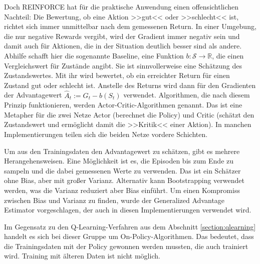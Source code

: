 Doch REINFORCE hat für die praktische Anwendung einen offensichtlichen Nachteil: Die Bewertung, ob eine Aktion >>gut<< oder >>schlecht<< ist, richtet sich immer unmittelbar nach dem gemessenen Return.
In einer Umgebung, die nur negative Rewards vergibt, wird der Gradient immer negativ sein und damit auch für Aktionen, die in der Situation deutlich besser sind als andere.
Abhilfe schafft hier die sogenannte Baseline, eine Funktion $b: \mathcal{S} \rightarrow \mathbb{R}$, die einen Vergleichswert für Zustände angibt.
Sie ist sinnvollerweise eine Schätzung des Zustandswertes.
Mit ihr wird bewertet, ob ein erreichter Return für einen Zustand gut oder schlecht ist.
Anstelle des Returns wird dann für den Gradienten der Advantagewert $\hat{A}_t := G_t - b(S_t)$ verwendet.
Algorithmen, die nach diesem Prinzip funktionieren, werden Actor-Critic-Algorithmen genannt.
Das ist eine Metapher für die zwei Netze Actor (berechnet die Policy) und Critic (schätzt den Zustandswert und ermöglicht damit die >>Kritik<< einer Aktion).
In manchen Implementierungen teilen sich die beiden Netze vordere Schichten.

Um aus den Trainingsdaten den Advantagewert zu schätzen, gibt es mehrere Herangehensweisen.
Eine Möglichkeit ist es, die Episoden bis zum Ende zu sampeln und die dabei gemessenen Werte zu verwenden.
Das ist ein Schätzer ohne Bias, aber mit großer Varianz.
Alternativ kann Bootstrapping verwendet werden, was die Varianz reduziert aber Bias einführt.
Um einen Kompromiss zwischen Bias und Varianz zu finden, wurde der Generalized Advantage Estimator \cite{https://doi.org/10.48550/arxiv.1506.02438} vorgeschlagen, der auch in diesen Implementierungen verwendet wird.

Im Gegensatz zu den Q-Learning-Verfahren aus dem Abschnitt \ref{section:qlearning} handelt es sich bei dieser Gruppe um On-Policy-Algorithmen.
Das bedeutet, dass die Trainingsdaten mit der Policy gewonnen werden mussten, die auch trainiert wird.
Training mit älteren Daten ist nicht möglich.

